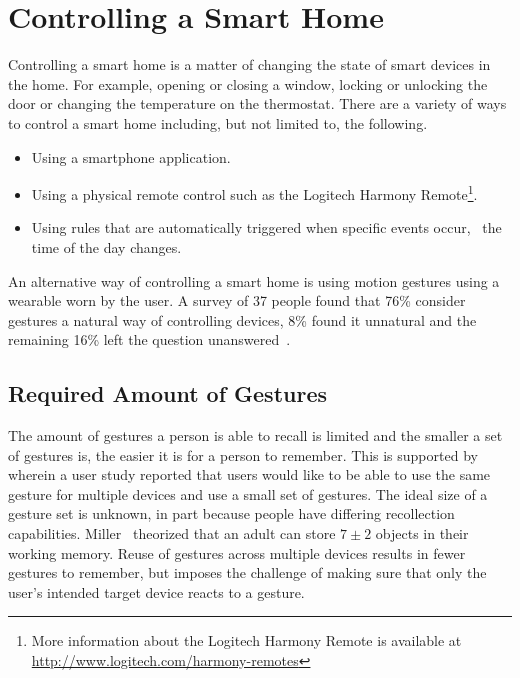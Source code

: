 \section{Controlling a Smart Home}
\label{sec:introduction:gesture-control}

Controlling a smart home is a matter of changing the state of smart devices in the home. For example, opening or closing a window, locking or unlocking the door or changing the temperature on the thermostat. There are a variety of ways to control a smart home including, but not limited to, the following.

\begin{itemize}
\item Using a smartphone application.
\item Using a physical remote control such as the Logitech Harmony Remote\footnote{More information about the Logitech Harmony Remote is available at \url{http://www.logitech.com/harmony-remotes}}.
\item Using rules that are automatically triggered when specific events occur, \eg~the time of the day changes.
\end{itemize}

An alternative way of controlling a smart home is using motion gestures using a wearable worn by the user. A survey of 37 people found that 76\% consider gestures a natural way of controlling devices, 8\% found it unnatural and the remaining 16\% left the question unanswered~\cite{Kela2006}.

\subsection{Required Amount of Gestures}

The amount of gestures a person is able to recall is limited and the smaller a set of gestures is, the easier it is for a person to remember. This is supported by~\cite{Kela2006} wherein a user study reported that users would like to be able to use the same gesture for multiple devices and use a small set of gestures.
The ideal size of a gesture set is unknown, in part because people have differing recollection capabilities. Miller~\cite{miller1956magical} theorized that an adult can store $7 \pm 2$ objects in their working memory.
Reuse of gestures across multiple devices results in fewer gestures to remember, but imposes the challenge of making sure that only the user's intended target device reacts to a gesture.

